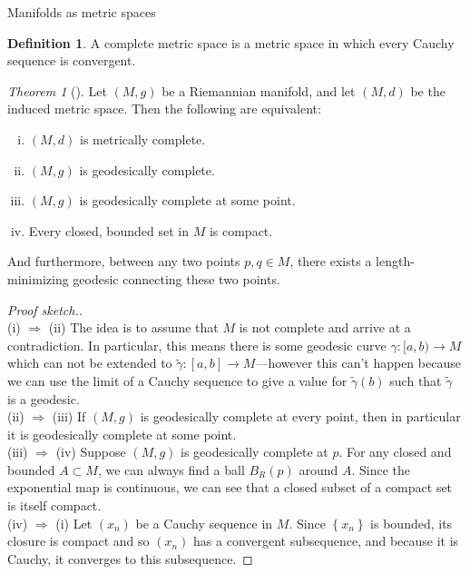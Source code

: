 \documentclass{article}
\newcommand{\fn}[3]{#1 \colon #2 \rightarrow #3}
\newcommand{\set}[1]{\left\{#1\right\}}
\theoremstyle{definition}
\newtheorem{definition}{Definition}[section]
\theoremstyle{remark}
\newtheorem{theorem}{Theorem}[section]
\begin{document}
\begin{section}{Manifolds as metric spaces}
  \begin{definition}
    A complete metric space is a metric space in which every Cauchy sequence is
    convergent.
  \end{definition}
  \begin{theorem}[\cite{Hopf}]
    Let $(M, g)$ be a Riemannian manifold, and let $(M, d)$ be the induced
    metric space. Then the following are equivalent:
    \begin{enumerate}[(i)]
      \item $(M, d)$ is metrically complete.
      \item $(M, g)$ is geodesically complete.
      \item $(M, g)$ is geodesically complete at some point.
      \item Every closed, bounded set in $M$ is compact. %
    \end{enumerate}
    And furthermore, between any two points $p, q \in M$, there exists a length-minimizing geodesic connecting these two points.
  \end{theorem}
  \begin{proof}[Proof sketch.] ~\\
    (i) $\Longrightarrow$ (ii) The idea is to assume that $M$ is not complete
    and arrive at a contradiction. In particular, this means there is some
    geodesic curve $\fn \gamma {[a, b)} M$ which can not be extended to
    $\fn {\widetilde\gamma} {[a, b]} M$---however this can't happen because
    we can use the limit of a Cauchy sequence to give a value for
    $\widetilde\gamma(b)$ such that $\widetilde\gamma$ is a geodesic.
    \\
    (ii) $\Longrightarrow$ (iii) If $(M, g)$ is geodesically complete at every
    point, then in particular it is geodesically complete at some point.
    \\
    (iii) $\Longrightarrow$ (iv) Suppose $(M, g)$ is geodesically complete at $p$.
    For any closed and bounded $A \subset M$, we can always find a ball $B_R(p)$
    around $A$. Since the exponential map is continuous, we can see that a
    closed subset of a compact set is itself compact.
    \\
    (iv) $\Longrightarrow$ (i) Let $(x_n)$ be a Cauchy sequence in $M$. Since
    $\set{x_n}$ is bounded, its closure is compact and so $(x_n)$ has a
    convergent subsequence, and because it is Cauchy, it converges to this subsequence.
  \end{proof}
\end{section}
\end{document}
